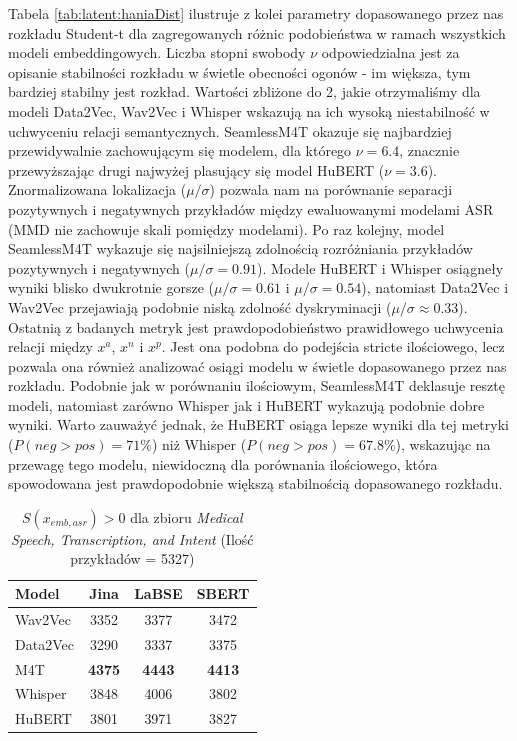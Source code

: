 Tabela \ref{tab:latent:haniaDist} ilustruje z kolei parametry dopasowanego przez nas rozkładu Student-t dla zagregowanych różnic podobieństwa w ramach wszystkich modeli embeddingowych. Liczba stopni swobody $\nu$ odpowiedzialna jest za opisanie stabilności rozkładu w świetle obecności ogonów - im większa, tym bardziej stabilny jest rozkład. Wartości zbliżone do 2, jakie otrzymaliśmy dla modeli Data2Vec, Wav2Vec i Whisper wskazują na ich wysoką niestabilność w uchwyceniu relacji semantycznych. SeamlessM4T okazuje się najbardziej przewidywalnie zachowującym się modelem, dla którego $\nu = 6.4$, znacznie przewyższając drugi najwyżej plasujący się model HuBERT ($\nu = 3.6$). Znormalizowana lokalizacja ($\mu/\sigma$) pozwala nam na porównanie separacji pozytywnych i negatywnych przykładów między ewaluowanymi modelami ASR (MMD nie zachowuje skali pomiędzy modelami). Po raz kolejny, model SeamlessM4T wykazuje się najsilniejszą zdolnością rozróżniania przykładów pozytywnych i negatywnych ($\mu/\sigma = 0.91$). Modele HuBERT i Whisper osiągneły wyniki blisko dwukrotnie gorsze ($\mu/\sigma = 0.61$ i $\mu/\sigma = 0.54$), natomiast Data2Vec i Wav2Vec przejawiają podobnie niską zdolność dyskryminacji ($\mu/\sigma \approx 0.33$). Ostatnią z badanych metryk jest prawdopodobieństwo prawidłowego uchwycenia relacji między $x^a$, $x^n$ i $x^p$. Jest ona podobna do podejścia stricte ilościowego, lecz pozwala ona również analizować osiągi modelu w świetle dopasowanego przez nas rozkładu. Podobnie jak w porównaniu ilościowym, SeamlessM4T deklasuje resztę modeli, natomiast zarówno Whisper jak i HuBERT wykazują podobnie dobre wyniki. Warto zauważyć jednak, że HuBERT osiąga lepsze wyniki dla tej metryki ($P(neg > pos) = 71\%$) niż Whisper ($P(neg>pos) = 67.8\%$), wskazując na przewagę tego modelu, niewidoczną dla porównania ilościowego, która spowodowana jest prawdopodobnie większą stabilnością dopasowanego rozkładu.

\begin{table}[ht]
\centering
\caption{$S(x_{emb,asr}) > 0$ dla zbioru \textit{Medical Speech, Transcription, and Intent} (Ilość przykładów = 5327)}
\label{tab:latent:haniaCounts}
\begin{tabular}{lccc}
\toprule
\textbf{Model} & \textbf{Jina} & \textbf{LaBSE} & \textbf{SBERT} \\
\midrule
Wav2Vec  & 3352 & 3377 & 3472 \\
Data2Vec & 3290 & 3337 & 3375 \\
M4T  & \textbf{4375} & \textbf{4443} & \textbf{4413} \\
Whisper  & 3848 & 4006 & 3802 \\
HuBERT   & 3801 & 3971 & 3827 \\
\bottomrule
\end{tabular}
\end{table}

